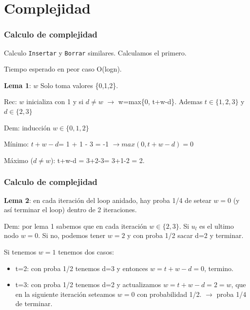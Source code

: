 \documentclass[10pt,handout]{beamer}
\begin{document}
\section{Complejidad}
\begin{frame}
\frametitle{Calculo de complejidad}

Calculo \texttt{Insertar} y \texttt{Borrar} similares.
Calculamos el primero.

Tiempo esperado  en peor caso O(logn).
\vspace{-0.2cm}
\pause


\textbf{Lema 1}: $w$ Solo toma valores \{0,1,2\}.

Rec: $w$ inicializa con 1 y si $d\neq w$ $\to$ w=max\{0, t+w-d\}.
Ademas $t\in\{1,2,3\}$ y $d\in\{2,3\}$

Dem: inducción $w\in \{0,1,2\}$

Mínimo: $t+w-d$= 1 + 1 - 3 = -1 $\rightarrow max(0, t+w-d)=0$

Máximo ($d\neq w$): t+w-d = 3+2-3= 3+1-2 = 2.


\end{frame}
\begin{frame}
\frametitle{Calculo de complejidad}
\textbf{Lema 2}: en cada iteración del loop anidado, hay proba 1/4 de setear $w=0$ (y así terminar el loop) dentro de 2 iteraciones.
\vspace{-0.2cm}

Dem: por lema 1 sabemos que en cada iteración $w\in\{2,3\}$.
Si $u_l$ es el ultimo nodo $w=0$.
Si no, podemos tener $w=2$ y con proba 1/2 sacar d=2 y terminar.

Si tenemos $w=1$ tenemos dos casos:
\vspace{-0.3cm}
\pause
\begin{itemize}\itemsep-1em
  \item t=2: con proba 1/2 tenemos d=3 y entonces $w=t+w-d=0$, termino.
\pause
  \item t=3: con proba 1/2 tenemos d=2 y actualizamos  $w=t+w-d=2=w$, que en la siguiente
    iteración seteamos $w=0$ con probabilidad 1/2. $\to$ proba 1/4 de terminar.
\end{itemize}


\end{frame}
\end{document}
